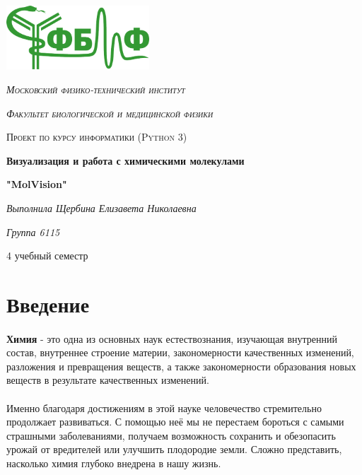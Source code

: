 \documentclass[a4paper,12pt]{article}
\begin{document}
\renewcommand{\figurename}{\textbf{Рис.}}		
\renewcommand{\tablename}{\textbf{Таблица}}	


\begin{titlepage}
	\centering
	\includegraphics[width=0.4\textwidth]{DBMP.png}\par\vspace{2 cm}
	{\scshape\LARGE\itshape Московский физико-технический институт \par}
	\vspace{1cm}
	{\scshape\LARGE\itshape Факультет биологической и медицинской физики \par}
	\vspace{0.5cm}
	{\scshape\Large  Проект по курсу информатики (Python 3) \par}
	\vspace{1.5cm}
	{\huge\bfseries Визуализация и работа с химическими молекулами \par}
	{\huge\bfseries "MolVision" \par}
	\vspace{2cm}
	{\Large\itshape Выполнила Щербина Елизавета Николаевна \par}
	{\Large\itshape Группа 6115 \par}
	
	
	{\large 4 учебный семестр\par}
\end{titlepage}

\newpage
\section{Введение}
\paragraph{} \textbf{Химия} - это одна из основных наук естествознания, изучающая внутренний состав, внутреннее строение материи, закономерности качественных изменений, разложения и превращения веществ, а также закономерности образования новых веществ в результате качественных изменений.
\paragraph{} Именно благодаря достижениям в этой науке человечество стремительно продолжает развиваться. С помощью неё мы не перестаем бороться с самыми страшными заболеваниями, получаем возможность сохранить и обезопасить урожай от вредителей или улучшить плодородие земли. Сложно представить, насколько химия глубоко внедрена в нашу жизнь.
\end{document}
